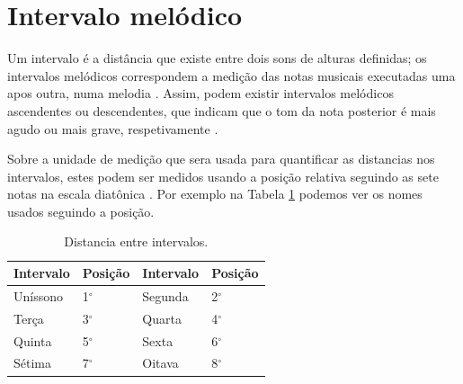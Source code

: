 
\section{Intervalo melódico}
\label{sec:intervalomelodico}


Um intervalo é a distância que existe entre dois sons de alturas definidas;
os intervalos melódicos correspondem a medição das notas musicais executadas uma apos outra, 
numa melodia \cite[pp. 17]{holst1998abc}.
Assim, podem existir intervalos melódicos ascendentes ou descendentes,
que indicam que o tom da nota posterior é mais agudo ou mais grave, respetivamente \cite[pp. 17]{holst1998abc}.

Sobre a unidade de medição que sera usada para quantificar as distancias nos intervalos, 
estes podem ser medidos usando a posição relativa seguindo as sete notas na escala diatônica \cite[pp. 17]{holst1998abc}.
Por exemplo na Tabela \ref{tab:intervalomelodico} podemos ver os nomes usados seguindo a posição.  
\begin{table}[h]
  \centering
  \begin{tabular}{|l|l||l|l|}
  \hline
  Intervalo & Posição     & Intervalo & Posição \\ \hline \hline
  Uníssono  & 1$^{\circ}$ & Segunda   & 2$^{\circ}$ \\ \hline
  Terça     & 3$^{\circ}$ & Quarta    & 4$^{\circ}$ \\ \hline
  Quinta    & 5$^{\circ}$ & Sexta     & 6$^{\circ}$ \\ \hline
  Sétima    & 7$^{\circ}$ & Oitava    & 8$^{\circ}$ \\ \hline
  \end{tabular}
  \caption{Distancia entre intervalos.}
  \label{tab:intervalomelodico}
\end{table}


